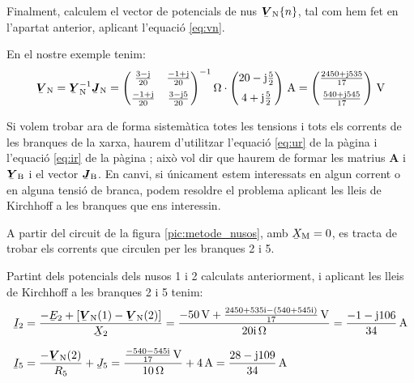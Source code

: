 Finalment,
calculem el vector de potencials de nus $\mcmplx{V}\ped{N}\{n\}$, tal
com  hem fet en l'apartat anterior, aplicant l'equació \eqref{eq:vn}.

En el nostre exemple tenim:
\[
   \mcmplx{V}\ped{N} = \mcmplx{Y}\ped{N}^{-1} \mcmplx{J}\ped{N} =
   \begin{pmatrix}
         \frac{3 - \ju}{20}  & \frac{-1 + \ju}{20} \\[2mm]
         \frac{-1 + \ju}{20} & \frac{3 - \ju 5}{20}
   \end{pmatrix} ^{-1}\unit{\ohm} \cdot
   \begin{pmatrix}
            20 - \ju \frac{5}{2} \\[2mm]
            4 + \ju \frac{5}{2}
   \end{pmatrix}\,\unit{A} =
   \begin{pmatrix}
         \frac{2450 + \ju 535}{17} \\[2mm]
         \frac{540  + \ju 545}{17}
   \end{pmatrix}\,\unit{V}
\]

Si volem trobar ara de forma sistemàtica totes les tensions i tots
els corrents   de les branques de la xarxa, haurem d'utilitzar
l'equació \eqref{eq:ur} de la pàgina \pageref{eq:ur} i l'equació
\eqref{eq:ir} de la pàgina \pageref{eq:ir}; això vol dir que haurem
de formar les matrius $\boldsymbol{A}$ i $\mcmplx{Y}\ped{B}$ i el
vector $\mcmplx{J}\ped{B}$. En canvi, si únicament estem
interessats en algun corrent o en alguna tensió de branca, podem
resoldre el problema aplicant les lleis de Kirchhoff a les branques
que ens interessin.

	
\begin{exemple}\label{ex:XarxaSenseAcobl}
	\addcontentsxms{\XarxaSenseAcobl}
    A partir del circuit de la figura \vref{pic:metode_nusos}, amb
    $\cmplx{X}\ped{M}=0$, es tracta de trobar els corrents que circulen
    per les branques 2 i 5.

    Partint dels potencials dels nusos 1 i 2 calculats anteriorment, i
    aplicant les lleis de Kirchhoff a les branques 2 i 5 tenim:
    \begin{align*}
       \cmplx{I}_2 &= \frac{-\cmplx{E}_2 + [\mcmplx{V}\ped{N}(1) - \mcmplx{V}\ped{N}(2)]}
                      {\cmplx{X}_2} = \frac{\qty{-50}{V} + \frac{\complexnum{2450+j535} - (\complexnum{540+
                      j545})}{17}\,\unit{V}}{\complexqty{j20}{\ohm}} = \frac{-1 - \ju 106}{34}\unit{\,A} \\[1.5ex]
       \cmplx{I}_5 &=  \frac{- \mcmplx{V}\ped{N}(2)}{R_5}  + \cmplx{J}_5 =                       \frac{\frac{\complexnum{-540-j545}}{17}\,\unit{V}}{\qty{10}{\ohm}} + \qty{4}{A} = \frac{28 - \ju 109}{34}\unit{\,A}
    \end{align*}
\end{exemple}

